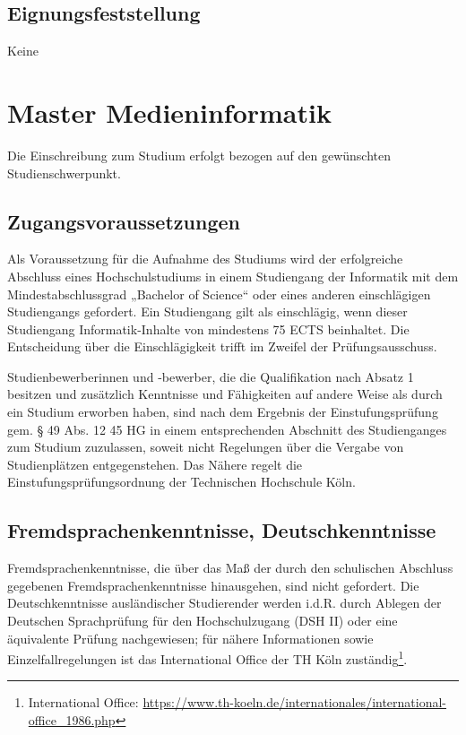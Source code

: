 \subsection{Eignungsfeststellung}\label{eignungsfeststellung}

Keine

\section{Master Medieninformatik}\label{master-medieninformatik-1}

Die Einschreibung zum Studium erfolgt bezogen auf den gewünschten
Studienschwerpunkt.

\subsection{Zugangsvoraussetzungen}\label{zugangsvoraussetzungen-1}

Als Voraussetzung für die Aufnahme des Studiums wird der erfolgreiche
Abschluss eines Hochschulstudiums in einem Studiengang der Informatik
mit dem Mindestabschlussgrad „Bachelor of Science`` oder eines anderen
einschlägigen Studiengangs gefordert. Ein Studiengang gilt als
einschlägig, wenn dieser Studiengang Informatik-Inhalte von mindestens
75 ECTS beinhaltet. Die Entscheidung über die Einschlägigkeit trifft im
Zweifel der Prüfungsausschuss.

Studienbewerberinnen und -bewerber, die die Qualifikation nach Absatz 1
besitzen und zusätzlich Kenntnisse und Fähigkeiten auf andere Weise als
durch ein Studium erworben haben, sind nach dem Ergebnis der
Einstufungsprüfung gem. § 49 Abs. 12 45 HG in einem entsprechenden
Abschnitt des Studienganges zum Studium zuzulassen, soweit nicht
Regelungen über die Vergabe von Studienplätzen entgegenstehen. Das
Nähere regelt die Einstufungsprüfungsordnung der Technischen Hochschule
Köln.

\subsection{Fremdsprachenkenntnisse,
Deutschkenntnisse}\label{fremdsprachenkenntnisse-deutschkenntnisse-1}

Fremdsprachenkenntnisse, die über das Maß der durch den schulischen
Abschluss gegebenen Fremdsprachenkenntnisse hinausgehen, sind nicht
gefordert. Die Deutschkenntnisse ausländischer Studierender werden
i.d.R. durch Ablegen der Deutschen Sprachprüfung für den Hochschulzugang
(DSH II) oder eine äquivalente Prüfung nachgewiesen; für nähere
Informationen sowie Einzelfallregelungen ist das International Office
der TH Köln zuständig\footnote{International Office:
  \url{https://www.th-koeln.de/internationales/international-office\_1986.php}}.

